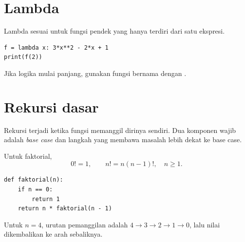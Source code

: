 \documentclass[11pt,a4paper]{report}
\newcommand{\kode}[1]{\texttt{\detokenize{#1}}}
\begin{document}
\section{Lambda}
Lambda sesuai untuk fungsi pendek yang hanya terdiri dari satu ekspresi.
\begin{lstlisting}
f = lambda x: 3*x**2 - 2*x + 1
print(f(2))
\end{lstlisting}
Jika logika mulai panjang, gunakan fungsi bernama dengan \kode{def}.

\section{Rekursi dasar}
Rekursi terjadi ketika fungsi memanggil dirinya sendiri. Dua komponen wajib adalah \textit{base case} dan langkah yang membawa masalah lebih dekat ke base case.

Untuk faktorial,
\[
0!=1,\qquad n!=n(n-1)!,\quad n\ge1.
\]
\begin{lstlisting}
def faktorial(n):
    if n == 0:
        return 1
    return n * faktorial(n - 1)
\end{lstlisting}
Untuk $n=4$, urutan pemanggilan adalah $4\to3\to2\to1\to0$, lalu nilai dikembalikan ke arah sebaliknya.
\end{document}
